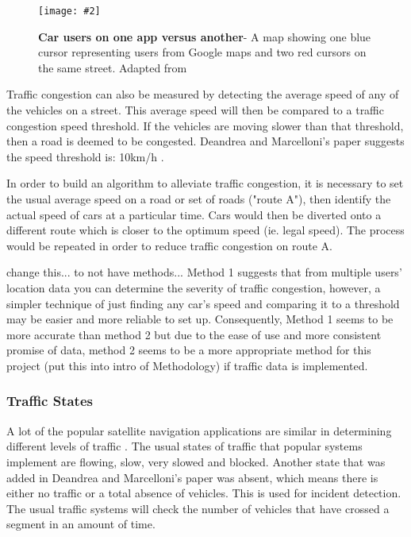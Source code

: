 \documentclass[12pt,a4paper]{article}
\newcommand{\figuremacro}[5]{
    \begin{figure}[#1]
        \centering
        \texttt{[image: \#2]}
        \caption[#3]{\textbf{#3}#4}
        \label{fig:#2}
    \end{figure}
}
\newcommand{\fancyfootnotetext}[2]{%
  \fancypagestyle{dingens}{%
    \fancyfoot[LO,RE]{\parbox{12cm}{\footnotemark[#1]\footnotesize #2}}%
  }%
  \thispagestyle{dingens}%
}
\begin{document}
\figuremacro{h}{tomtomTracking}{Car users on one app versus another}{- A map showing one blue cursor representing users from Google maps \footnotemark[1] and two red cursors on the same street. Adapted from \cite{TomTomMyDrive}}{1.0}

\fancyfootnotetext{\value{footnote}}{https://www.google.com/maps}
Traffic congestion can also be measured by detecting the average speed of any of the vehicles on a street. This average speed will then be compared to a traffic congestion speed threshold. If the vehicles are moving slower than that threshold, then a road is deemed to be congested. Deandrea and Marcelloni’s paper suggests the speed threshold is: 10km/h \cite{DAndrea2017}.

In order to build an algorithm to alleviate traffic congestion, it is necessary to set the usual average speed on a road or set of roads ("route A"), then identify the actual speed of cars at a particular time. Cars would then be diverted onto a different route which is closer to the optimum speed (ie. legal speed). The process would be repeated in order to reduce traffic congestion on route A. \cite{Zheng2018}

change this... to not have methods...
Method 1 suggests that from multiple users’ location data you can determine the severity of traffic congestion, however, a simpler technique of just finding any car’s speed and comparing it to a threshold may be easier and more reliable to set up. Consequently, Method 1 seems to be more accurate than method 2 but due to the ease of use and more consistent promise of data, method 2 seems to be a more appropriate method for this project (put this into intro of Methodology) if traffic data is implemented.

\subsubsection{Traffic States}

A lot of the popular satellite navigation applications are similar in determining different levels of traffic \cite{DAndrea2017}. The usual states of traffic that popular systems implement are flowing, slow, very slowed and blocked. Another state that was added in Deandrea and Marcelloni’s paper was absent, which means there is either no traffic or a total absence of vehicles. This is used for incident detection. The usual traffic systems will check the number of vehicles that have crossed a segment in an amount of time.
\end{document}
